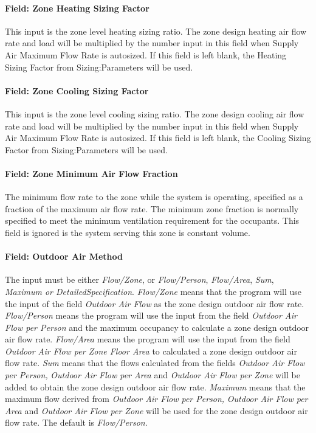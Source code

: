 \paragraph{Field: Zone Heating Sizing Factor}\label{field-zone-heating-sizing-factor-11}

This input is the zone level heating sizing ratio. The zone design heating air flow rate and load will be multiplied by the number input in this field when Supply Air Maximum Flow Rate is autosized. If this field is left blank, the Heating Sizing Factor from Sizing:Parameters will be used.

\paragraph{Field: Zone Cooling Sizing Factor}\label{field-zone-cooling-sizing-factor-10}

This input is the zone level cooling sizing ratio. The zone design cooling air flow rate and load will be multiplied by the number input in this field when Supply Air Maximum Flow Rate is autosized. If this field is left blank, the Cooling Sizing Factor from Sizing:Parameters will be used.

\paragraph{Field: Zone Minimum Air Flow Fraction}\label{field-zone-minimum-air-flow-fraction-000}

The minimum flow rate to the zone while the system is operating, specified as a fraction of the maximum air flow rate. The minimum zone fraction is normally specified to meet the minimum ventilation requirement for the occupants. This field is ignored is the system serving this zone is constant volume.

\paragraph{Field: Outdoor Air Method}\label{field-outdoor-air-method-12}

The input must be either \emph{Flow/Zone}, or \emph{Flow/Person}, \emph{Flow/Area}, \emph{Sum}, \emph{Maximum or DetailedSpecification}. \emph{Flow/Zone} means that the program will use the input of the field \emph{Outdoor Air Flow} as the zone design outdoor air flow rate. \emph{Flow/Person} means the program will use the input from the field \emph{Outdoor Air Flow per Person} and the maximum occupancy to calculate a zone design outdoor air flow rate. \emph{Flow/Area} means the program will use the input from the field \emph{Outdoor Air Flow per Zone Floor Area} to calculated a zone design outdoor air flow rate. \emph{Sum} means that the flows calculated from the fields \emph{Outdoor Air Flow per Person,} \emph{Outdoor Air Flow per Area} and \emph{Outdoor Air Flow per Zone} will be added to obtain the zone design outdoor air flow rate. \emph{Maximum} means that the maximum flow derived from \emph{Outdoor Air Flow per Person,} \emph{Outdoor Air Flow per Area} and \emph{Outdoor Air Flow per Zone} will be used for the zone design outdoor air flow rate. The default is \emph{Flow/Person}.

